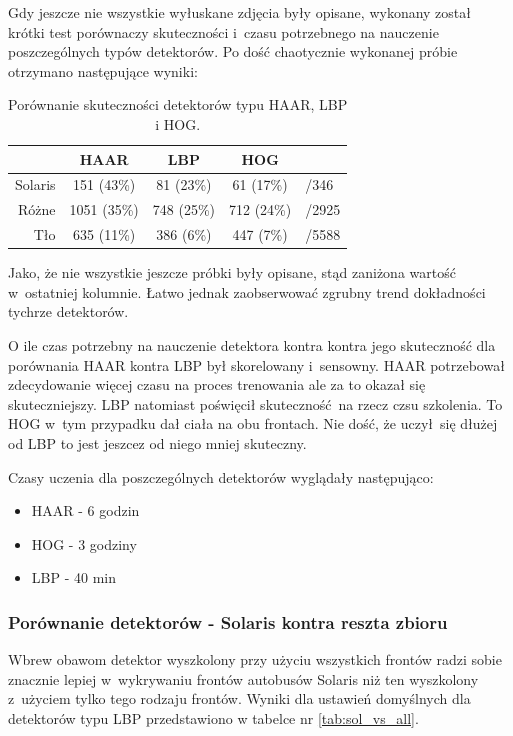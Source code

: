 Gdy jeszcze nie wszystkie wyłuskane zdjęcia były opisane, wykonany został
krótki test porównaczy skuteczności i~czasu potrzebnego na nauczenie
poszczególnych typów detektorów. Po dość chaotycznie wykonanej próbie
otrzymano następujące wyniki:

\begin{table}[!h]
\centering
\begin{tabular}{r|c|c|c|l}
    & HAAR         & LBP        & HOG              &       \\
    \hline
Solaris & 151  (43\%)  & 81  (23\%) & 61 (17\%)        & /346  \\
Różne   & 1051 (35\%)  & 748 (25\%) & 712 (24\%)       & /2925 \\
Tło     & 635  (11\%)  & 386 (6\%)  & 447 (7\%)        & /5588 \\
\end{tabular}
\caption{Porównanie skuteczności detektorów typu HAAR, LBP i HOG.}
\label{tab:haar_lbp_hog_comparison}
\end{table}

Jako, że nie wszystkie jeszcze próbki były opisane, stąd zaniżona wartość
w~ostatniej kolumnie. Łatwo jednak zaobserwować zgrubny trend dokładności
tychrze detektorów.

O ile czas potrzebny na nauczenie detektora kontra kontra jego skuteczność
dla porównania HAAR kontra LBP był skorelowany i~sensowny. HAAR potrzebował
zdecydowanie więcej czasu na proces trenowania ale za to okazał się
skuteczniejszy. LBP natomiast poświęcił skuteczność na rzecz czsu szkolenia.
To HOG w~tym przypadku dał ciała na obu frontach. Nie dość, że uczył się
dłużej od LBP to jest jeszcez od niego mniej skuteczny.

Czasy uczenia dla poszczególnych detektorów wyglądały następująco:
\begin{itemize}
    \item HAAR - 6 godzin
    \item HOG - 3 godziny
    \item LBP - 40 min
\end{itemize}

\subsubsection{Porównanie detektorów - Solaris kontra reszta zbioru}

Wbrew obawom detektor wyszkolony przy użyciu wszystkich frontów radzi
sobie znacznie lepiej w~wykrywaniu frontów autobusów Solaris niż ten
wyszkolony z~użyciem tylko tego rodzaju frontów. Wyniki dla ustawień
domyślnych dla detektorów typu LBP przedstawiono w tabelce nr 
\ref{tab:sol_vs_all}.

